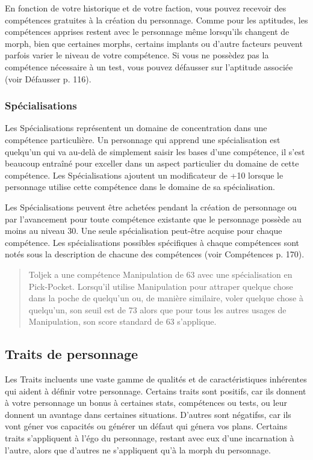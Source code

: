 En fonction de votre historique et de votre faction, vous pouvez recevoir des compétences gratuites à la création du personnage. Comme pour les aptitudes, les compétences apprises restent avec le personnage même lorsqu'ils changent de morph, bien que certaines morphs, certains implants ou d'autre facteurs peuvent parfois varier le niveau de votre compétence. Si vous ne possèdez pas la compétence nécessaire à un test, vous pouvez défausser sur l'aptitude associée (voir Défausser p. 116). 

\subsubsection{Spécialisations} \label{sec:specializations} 

Les Spécialisations représentent un domaine de concentration dans une compétence particulière. Un personnage qui apprend une spécialisation est quelqu'un qui va au-delà de simplement saisir les bases d'une compétence, il s'est beaucoup entraîné pour exceller dans un aspect particulier du domaine de cette compétence. Les Spécialisations ajoutent un modificateur de +10 lorsque le personnage utilise cette compétence dans le domaine de sa spécialisation. 

Les Spécialisations peuvent être achetées pendant la création de personnage ou par l'avancement pour toute compétence existante que le personnage possède au moins au niveau 30. Une seule spécialisation peut-être acquise pour chaque compétence. Les spécialisations possibles spécifiques à chaque compétences sont notés sous la description de chacune des compétences (voir Compétences p. 170). 

\begin{quotation} Toljek a une compétence Manipulation de 63 avec une spécialisation en Pick-Pocket. Lorsqu'il utilise Manipulation pour attraper quelque chose dans la poche de quelqu'un ou, de manière similaire, voler quelque chose à quelqu'un, son seuil est de 73 alors que pour tous les autres usages de Manipulation, son score standard de 63 s'applique. \end{quotation} 

\subsection{Traits de personnage} \label{sec:character-traits} 

Les Traits incluents une vaste gamme de qualités et de caractéristiques inhérentes qui aident à définir votre personnage. Certains traits sont positifs, car ils donnent à votre personnage un bonus à certaines stats, compétences ou tests, ou leur donnent un avantage dans certaines situations. D'autres sont négatifss, car ils vont géner vos capacités ou générer un défaut qui génera vos plans. Certains traits s'appliquent à l'égo du personnage, restant avec eux d'une incarnation à l'autre, alors que d'autres ne s'appliquent qu'à la morph du personnage. 

